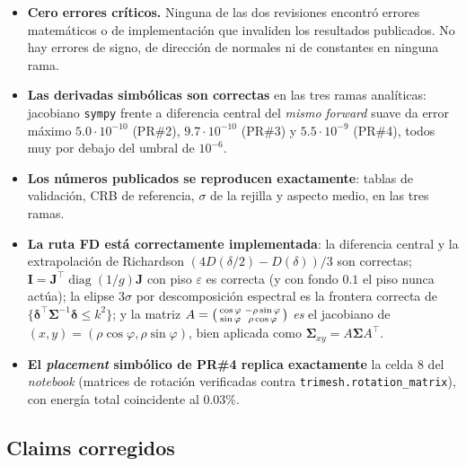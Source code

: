\documentclass[11pt,a4paper]{article}
\newcommand{\vect}[1]{\boldsymbol{#1}}
\newcommand{\matr}[1]{\mathbf{#1}}
\newcommand{\code}[1]{\texttt{#1}}
\theoremstyle{definition}
\begin{document}
\begin{itemize}[leftmargin=*]
  \item \textbf{Cero errores críticos.} Ninguna de las dos revisiones encontró
        errores matemáticos o de implementación que invaliden los resultados
        publicados. No hay errores de signo, de dirección de normales ni de
        constantes en ninguna rama.
  \item \textbf{Las derivadas simbólicas son correctas} en las tres ramas
        analíticas: jacobiano \code{sympy} frente a diferencia central del
        \emph{mismo} \emph{forward} suave da error máximo $5.0\cdot10^{-10}$
        (PR\#2), $9.7\cdot10^{-10}$ (PR\#3) y $5.5\cdot10^{-9}$ (PR\#4), todos
        muy por debajo del umbral de $10^{-6}$.
  \item \textbf{Los números publicados se reproducen exactamente}: tablas de
        validación, CRB de referencia, $\sigma$ de la rejilla y aspecto medio,
        en las tres ramas.
  \item \textbf{La ruta FD está correctamente implementada}: la diferencia
        central y la extrapolación de Richardson $(4D(\delta/2)-D(\delta))/3$
        son correctas; $\matr I = \matr J^\top\operatorname{diag}(1/g)\matr J$
        con piso $\varepsilon$ es correcta (y con fondo $0.1$ el piso nunca
        actúa); la elipse $3\sigma$ por descomposición espectral es la frontera
        correcta de $\{\vect\delta^\top\matr\Sigma^{-1}\vect\delta\le k^2\}$; y
        la matriz $A=\begin{psmallmatrix}\cos\varphi & -\rho\sin\varphi\\
        \sin\varphi & \rho\cos\varphi\end{psmallmatrix}$ \emph{es} el jacobiano
        de $(x,y)=(\rho\cos\varphi,\rho\sin\varphi)$, bien aplicada como
        $\matr\Sigma_{xy}=A\matr\Sigma A^\top$.
  \item \textbf{El \emph{placement} simbólico de PR\#4 replica exactamente} la
        celda 8 del \emph{notebook} (matrices de rotación verificadas contra
        \code{trimesh.rotation\_matrix}), con energía total coincidente al
        $0.03\%$.
\end{itemize}

\subsection{Claims corregidos}
\end{document}
